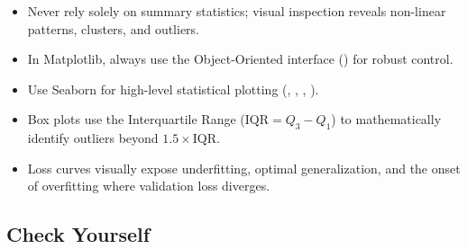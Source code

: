 \begin{takeaways}
\begin{itemize}
    \item Never rely solely on summary statistics; visual inspection reveals non-linear patterns, clusters, and outliers.
    \item In Matplotlib, always use the Object-Oriented interface () for robust control.
    \item Use Seaborn for high-level statistical plotting (, , , ).
    \item Box plots use the Interquartile Range ($\text{IQR} = Q_3 - Q_1$) to mathematically identify outliers beyond $1.5 \times \text{IQR}$.
    \item Loss curves visually expose underfitting, optimal generalization, and the onset of overfitting where validation loss diverges.
\end{itemize}
\end{takeaways}

\subsection{Check Yourself}

